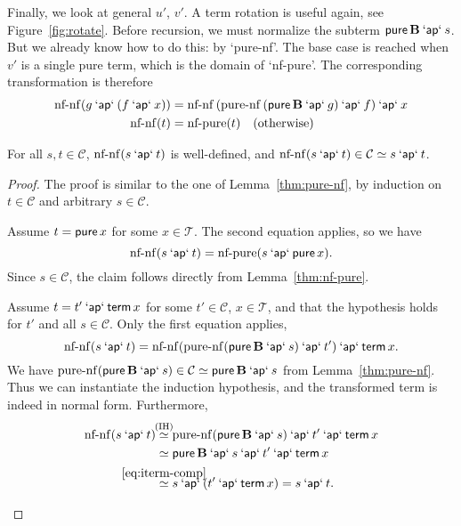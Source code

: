 Finally, we look at general $u'$, $v'$.
A term rotation is useful again, see Figure~\ref{fig:rotate}.
Before recursion, we must normalize the subterm $\operatorname{\mathsf{pure}} \mathbf{B} \mathbin{\mathsf{`ap`}} s$.
But we already know how to do this: by `pure-nf'.
The base case is reached when $v'$ is a single pure term, which is the domain
of `nf-pure'.
The corresponding transformation is therefore
\begin{align}
	\operatorname{nf-nf}(g \mathbin{\mathsf{`ap`}} (f \mathbin{\mathsf{`ap`}} x)) &=
		\operatorname{nf-nf}{(\operatorname{pure-nf}{(\operatorname{\mathsf{pure}} \mathbf{B} \mathbin{\mathsf{`ap`}} g)} \mathbin{\mathsf{`ap`}} f)} \mathbin{\mathsf{`ap`}} x \\
	\operatorname{nf-nf}(t) &= \operatorname{nf-pure}(t) \quad\text{(otherwise)}
\end{align}
\begin{lemma}\label{thm:nf-nf}
For all $s,t \in \mathcal{C}$,
$\operatorname{nf-nf}(s \mathbin{\mathsf{`ap`}} t)$ is well-defined, and
$\operatorname{nf-nf}(s \mathbin{\mathsf{`ap`}} t) \in \mathcal{C} \simeq s \mathbin{\mathsf{`ap`}} t$.
\end{lemma}
\begin{proof}
The proof is similar to the one of Lemma~\ref{thm:pure-nf}, by induction on
$t \in \mathcal{C}$ and arbitrary $s \in \mathcal{C}$.
\begin{prfcases}
\item Assume $t = \operatorname{\mathsf{pure}} x$ for some $x \in \mathcal{T}$.
	The second equation applies, so we have
	\[ \operatorname{nf-nf}(s \mathbin{\mathsf{`ap`}} t) = \operatorname{nf-pure}(s \mathbin{\mathsf{`ap`}} \operatorname{\mathsf{pure}} x). \]
	Since $s \in \mathcal{C}$, the claim follows directly from Lemma~\ref{thm:nf-pure}.
\item Assume $t = t' \mathbin{\mathsf{`ap`}} \operatorname{\mathsf{term}} x$ for some
	$t' \in \mathcal{C}$, $x \in \mathcal{T}$, and that the hypothesis holds
	for $t'$ and all $s \in \mathcal{C}$.
	Only the first equation applies,
	\[ \operatorname{nf-nf}(s \mathbin{\mathsf{`ap`}} t) =
		\operatorname{nf-nf} (\operatorname{pure-nf}(\operatorname{\mathsf{pure}} \mathbf{B} \mathbin{\mathsf{`ap`}} s) \mathbin{\mathsf{`ap`}} t') \mathbin{\mathsf{`ap`}} \operatorname{\mathsf{term}} x. \]
	We have
	$\operatorname{pure-nf}(\operatorname{\mathsf{pure}} \mathbf{B} \mathbin{\mathsf{`ap`}} s) \in \mathcal{C} \simeq \operatorname{\mathsf{pure}} \mathbf{B} \mathbin{\mathsf{`ap`}} s$
	from Lemma~\ref{thm:pure-nf}.
	Thus we can instantiate the induction hypothesis, and the transformed term
	is indeed in normal form.
	Furthermore,
	\begin{align*}
		\operatorname{nf-nf}(s \sap t) &\stackrel{\mathclap{\text{(IH)}}}{\simeq}
			\operatorname{pure-nf}(\spure \mathbf{B} \sap s) \sap t' \sap \sterm x \\
		&\simeq \spure \mathbf{B} \sap s \sap t' \sap \sterm x \\
		&\stackrel{\mathclap{\eqref{eq:iterm-comp}}}{\simeq}
			s \sap (t' \sap \sterm x) = s \sap t. \qedhere
	\end{align*}
\end{prfcases}
\end{proof}

